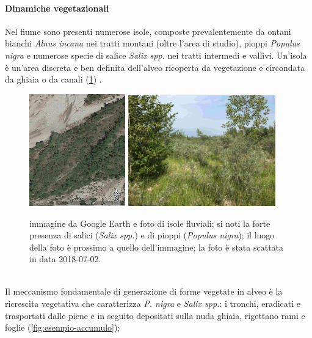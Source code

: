 \paragraph{Dinamiche vegetazionali}
Nel fiume sono presenti numerose isole, composte prevalentemente da ontani bianchi \emph{Alnus incana} nei tratti montani (oltre l'area di studio), pioppi \emph{Populus nigra} e numerose specie di salice \emph{Salix spp.} nei tratti intermedi e vallivi.
Un'isola è un'area discreta e ben definita dell'alveo ricoperta da vegetazione e circondata da ghiaia o da canali (\cref{fig:esempio-isola}) .
%
\begin{figure}
	\centering
	\includegraphics[width = 0.37\textwidth]{files/esempio_isola_sat_1.jpg}
	\quad
	\includegraphics[width = 0.57\textwidth]{files/esempio_isola_1.jpg}
	\caption[immagine e foto di isole fluviali]{immagine da Google Earth e foto di isole fluviali; si noti la forte presenza di salici (\emph{Salix spp.}) e di pioppi (\emph{Populus nigra}); il luogo della foto è prossimo a quello dell'immagine; la foto è stata scattata in data 2018-07-02.}
	\label{fig:esempio-isola}
\end{figure}
%
\\
Il meccanismo fondamentale di generazione di forme vegetate in alveo è la ricrescita vegetativa che caratterizza \emph{P. nigra} e \emph{Salix spp.}: i tronchi, eradicati e trasportati dalle piene e in seguito depositati sulla nuda ghiaia, rigettano rami e foglie (\cref{fig:esempio-accumulo});
